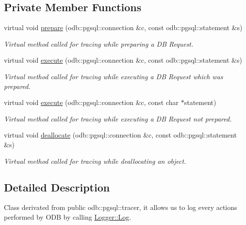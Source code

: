 \subsection*{Private Member Functions}
\begin{DoxyCompactItemize}
\item 
virtual void \hyperlink{class_app_tracer_a1e3008d69d12fa709403ee44c0c98266}{prepare} (odb\+::pgsql\+::connection \&c, const odb\+::pgsql\+::statement \&s)
\begin{DoxyCompactList}\small\item\em Virtual method called for tracing while preparing a D\+B Request. \end{DoxyCompactList}\item 
virtual void \hyperlink{class_app_tracer_a9e608afb7779fc54c0310039eb0a8222}{execute} (odb\+::pgsql\+::connection \&c, const odb\+::pgsql\+::statement \&s)
\begin{DoxyCompactList}\small\item\em Virtual method called for tracing while executing a D\+B Request which was prepared. \end{DoxyCompactList}\item 
virtual void \hyperlink{class_app_tracer_a550fa2f86cc468517d5ec1bdd654f729}{execute} (odb\+::pgsql\+::connection \&c, const char $\ast$statement)
\begin{DoxyCompactList}\small\item\em Virtual method called for tracing while executing a D\+B Request not prepared. \end{DoxyCompactList}\item 
virtual void \hyperlink{class_app_tracer_af3b3cf7b883f1c0a1546a9840ea09cda}{deallocate} (odb\+::pgsql\+::connection \&c, const odb\+::pgsql\+::statement \&s)
\begin{DoxyCompactList}\small\item\em Virtual method called for tracing while deallocating an object. \end{DoxyCompactList}\end{DoxyCompactItemize}


\subsection{Detailed Description}
Class derivated from public odb\+::pgsql\+::tracer, it allows us to log every actions performed by O\+D\+B by calling \hyperlink{class_logger_aff5ed1580283bcdac191d9ace376b977}{Logger\+::\+Log}. 

